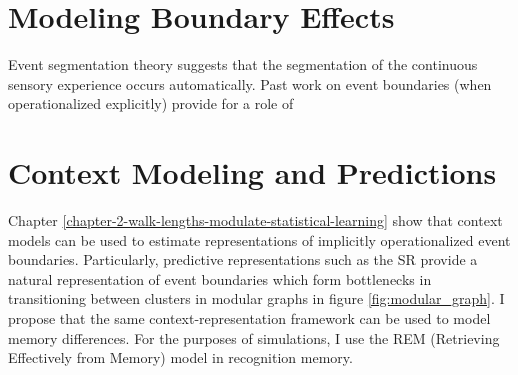 \section{Modeling Boundary Effects}
Event segmentation theory suggests that the segmentation of the continuous sensory experience occurs automatically\cite{swallow2009event}. Past work on event boundaries (when operationalized explicitly) provide for a role of 

\section{Context Modeling and Predictions}
Chapter \ref{chapter-2-walk-lengths-modulate-statistical-learning} show that context models can be used to estimate representations of implicitly operationalized event boundaries. Particularly, predictive representations such as the SR provide a natural representation of event boundaries which form bottlenecks in transitioning between clusters in modular graphs in figure \ref{fig:modular_graph}. I propose that the same context-representation framework can be used to model memory differences. For the purposes of simulations, I use the REM (Retrieving Effectively from Memory) model in recognition memory\cite{shiffrin1997model}.